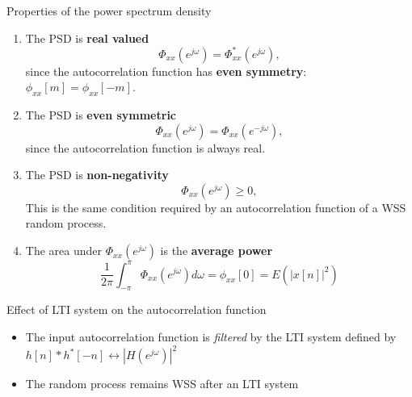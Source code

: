 \documentclass[10pt]{beamer}
\begin{document}
\begin{frame}{Properties of the power spectrum density}

\begin{enumerate} 
	\item The PSD is \textbf{real valued}
	\begin{equation*}
	\Phi_{xx}(e^{j\omega}) = \Phi^*_{xx}(e^{j\omega}),
	\end{equation*}
	since the autocorrelation function has\textbf{ even symmetry}: $\phi_{xx}[m] = \phi_{xx}[-m]$.
	
	\item The PSD is \textbf{even symmetric} 
	\begin{equation*}
	\Phi_{xx}(e^{j\omega}) = \Phi_{xx}(e^{-j\omega}),
	\end{equation*}
	since the autocorrelation function is always real. 
	
	\item The PSD is \textbf{non-negativity} 
	\begin{equation*}
	\Phi_{xx}(e^{j\omega}) \geq 0,
	\end{equation*}
	This is the same condition required by an autocorrelation function of a WSS random process.
	
	\item The area under $\Phi_{xx}(e^{j\omega})$ is the \textbf{average power}
	\begin{equation*}
	\frac{1}{2\pi}\int_{-\pi}^{\pi} \Phi_{xx}(e^{j\omega})d\omega = \phi_{xx}[0] = E(|x[n]|^2)
	\end{equation*}
	
\end{enumerate} 

\end{frame}

\begin{frame}{Effect of LTI system on the autocorrelation function}
\begin{center}
	\resizebox{0.8\linewidth}{!}{}
\end{center}

\begin{itemize}
	\item The input autocorrelation function is \textit{filtered} by the LTI system defined by $h[n]\ast h^*[-n] \leftrightarrow |H(e^{j\omega})|^2$ 
	\item The random process remains WSS after an LTI system
\end{itemize}

\end{frame}
\end{document}
